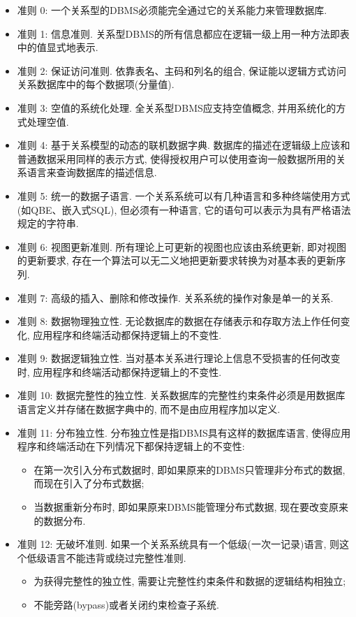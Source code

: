 \begin{itemize}
    \item 准则 0: 一个关系型的DBMS必须能完全通过它的关系能力来管理数据库.
    \item 准则 1: 信息准则. 关系型DBMS的所有信息都应在逻辑一级上用一种方法即表中的值显式地表示.
    \item 准则 2: 保证访问准则. 依靠表名、主码和列名的组合, 保证能以逻辑方式访问关系数据库中的每个数据项(分量值).
    \item 准则 3: 空值的系统化处理. 全关系型DBMS应支持空值概念, 并用系统化的方式处理空值.
    \item 准则 4: 基于关系模型的动态的联机数据字典. 数据库的描述在逻辑级上应该和普通数据采用同样的表示方式, 使得授权用户可以使用查询一般数据所用的关系语言来查询数据库的描述信息.
    \item 准则 5: 统一的数据子语言. 一个关系系统可以有几种语言和多种终端使用方式(如QBE、嵌入式SQL), 但必须有一种语言, 它的语句可以表示为具有严格语法规定的字符串.
    \item 准则 6: 视图更新准则.  所有理论上可更新的视图也应该由系统更新, 即对视图的更新要求, 存在一个算法可以无二义地把更新要求转换为对基本表的更新序列.
    \item 准则 7: 高级的插入、删除和修改操作. 关系系统的操作对象是单一的关系.
    \item 准则 8: 数据物理独立性. 无论数据库的数据在存储表示和存取方法上作任何变化, 应用程序和终端活动都保持逻辑上的不变性.
    \item 准则 9: 数据逻辑独立性. 当对基本关系进行理论上信息不受损害的任何改变时, 应用程序和终端活动都保持逻辑上的不变性.
    \item 准则 10: 数据完整性的独立性. 关系数据库的完整性约束条件必须是用数据库语言定义并存储在数据字典中的, 而不是由应用程序加以定义.
    \item 准则 11: 分布独立性. 分布独立性是指DBMS具有这样的数据库语言, 使得应用程序和终端活动在下列情况下都保持逻辑上的不变性:
    \begin{itemize}
        \item 在第一次引入分布式数据时, 即如果原来的DBMS只管理非分布式的数据, 而现在引入了分布式数据;
        \item 当数据重新分布时, 即如果原来DBMS能管理分布式数据, 现在要改变原来的数据分布.
    \end{itemize}
    \item 准则 12: 无破坏准则. 如果一个关系系统具有一个低级(一次一记录)语言, 则这个低级语言不能违背或绕过完整性准则.
    \begin{itemize}
        \item 为获得完整性的独立性, 需要让完整性约束条件和数据的逻辑结构相独立;
        \item 不能旁路(bypass)或者关闭约束检查子系统.
    \end{itemize}
\end{itemize}

